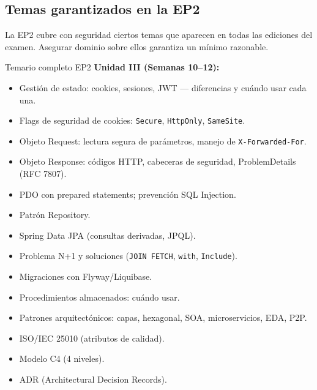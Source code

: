 \subsection{Temas garantizados en la EP2}

La EP2 cubre con seguridad ciertos temas que aparecen en
todas las ediciones del examen. Asegurar dominio sobre ellos
garantiza un mínimo razonable.


\begin{cajaadvertencia}{Temario completo EP2}
\textbf{Unidad III (Semanas 10--12):}
\begin{itemize}
\item Gestión de estado: cookies, sesiones, JWT --- diferencias y
cuándo usar cada una.
\item Flags de seguridad de cookies: \texttt{Secure}, \texttt{HttpOnly},
\texttt{SameSite}.
\item Objeto Request: lectura segura de parámetros, manejo de
\texttt{X-Forwarded-For}.
\item Objeto Response: códigos HTTP, cabeceras de seguridad,
ProblemDetails (RFC 7807).
\item PDO con prepared statements; prevención SQL Injection.
\item Patrón Repository.
\item Spring Data JPA (consultas derivadas, JPQL).
\item Problema N+1 y soluciones (\texttt{JOIN FETCH}, \texttt{with},
\texttt{Include}).
\item Migraciones con Flyway/Liquibase.
\item Procedimientos almacenados: cuándo usar.
\item Patrones arquitectónicos: capas, hexagonal, SOA, microservicios,
EDA, P2P.
\item ISO/IEC 25010 (atributos de calidad).
\item Modelo C4 (4 niveles).
\item ADR (Architectural Decision Records).
\end{itemize}


\end{cajaadvertencia}
